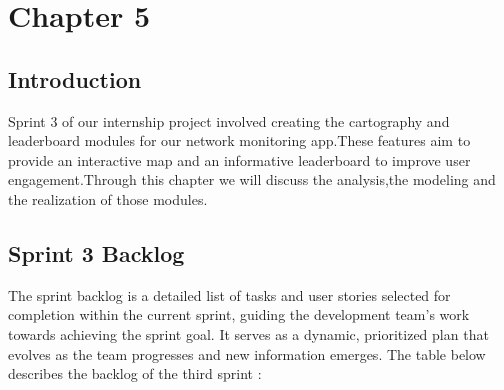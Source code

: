 
\chapter*{Chapter 5}


\setcounter{chapter}{5}
\setcounter{section}{0}
\setcounter{table}{0} 
\setcounter{figure}{0} 


\vspace{0.25cm}

\setcounter{tocdepth}{1}
\headrule


\localtableofcontents
\newpage

\section*{Introduction}
Sprint 3 of our internship project involved creating the cartography and leaderboard modules for our network monitoring app.These features aim to provide an interactive map and an informative leaderboard to improve user engagement.Through this chapter we will discuss the analysis,the modeling and the realization of those modules.

\section{Sprint 3 Backlog}

The sprint backlog is a detailed list of tasks and user stories selected for completion within the current sprint, guiding the development team's work towards achieving the sprint goal. It serves as a dynamic, prioritized plan that evolves as the team progresses and new information emerges.
The table below describes the backlog of the third sprint :



